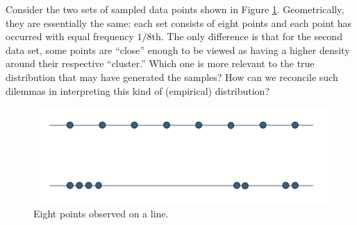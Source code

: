 \documentclass[../../book-main.tex]{subfiles}
\begin{document}
\begin{example}[Density]\label{eg:density} Consider the two sets of sampled data points shown in Figure \ref{fig:1d-line}. Geometrically, they are essentially the same: each set consists of eight points and each point has occurred with equal frequency $1/8$th. The only difference is that for the second data set, some points are ``close'' enough to be viewed as having a higher density around their respective ``cluster.'' Which one is more relevant to the true distribution that may have generated the samples? How can we reconcile such dilemmas in interpreting this kind of (empirical) distribution?
\begin{figure}[t]
	\centering
	\includegraphics[width=0.7\linewidth]{chapters/chapter3/figs/one-dim-distribution.png}
	\caption{Eight points observed on a line.}
	\label{fig:1d-line}
\end{figure}
\end{example}



\end{document}
